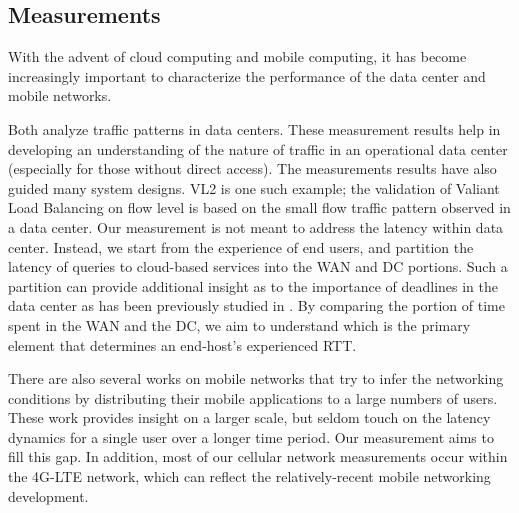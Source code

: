 \subsection{Measurements}
\label{sec:measurements}

With the advent of cloud computing and mobile computing, it has become increasingly important to characterize the performance of the data center and mobile networks. 

Both \cite{benson2010network, kandula2009nature} analyze traffic patterns in data centers. These measurement results help in developing an understanding of the nature of traffic in an operational data center (especially for those without direct access). The measurements results have also guided many system designs. VL2 \cite{greenberg2009vl2} is one such example; the validation of Valiant Load Balancing on flow level is based on the small flow traffic pattern observed in a data center. Our measurement is not meant to address the latency within data center. Instead, we start from the experience of end users, and partition the latency of queries to cloud-based services into the WAN and DC portions. Such a partition can provide additional insight as to the importance of deadlines in the data center as has been previously studied in \cite{wilson2011better}. By comparing the portion of time spent in the WAN and the DC, we aim to understand which is the primary element that determines an end-host's experienced RTT.

There are also several works on mobile networks \cite{xu2011cellular, huang2011mobiperf} that try to infer the networking conditions by distributing their mobile applications to a large numbers of users. These work provides insight on a larger scale, but seldom touch on the latency dynamics for a single user over a longer time period. Our measurement aims to fill this gap. In addition, most of our cellular network measurements occur within the 4G-LTE network, which can reflect the relatively-recent mobile networking development.



